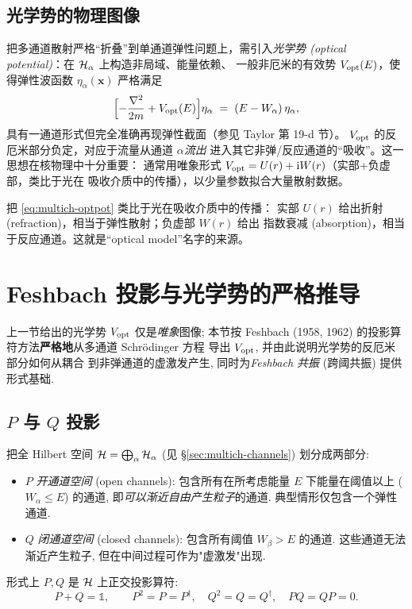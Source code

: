\subsection{光学势的物理图像}
\label{sec:multich-optpot}

把多通道散射严格“折叠”到单通道弹性问题上，需引入\emph{光学势
(optical potential)}：在 $\mathcal{H}_\alpha$ 上构造非局域、能量依赖、
一般非厄米的有效势 $V_{\rm opt}(E)$，使得弹性波函数
$\eta_\alpha(\mathbf{x})$ 严格满足
\begin{equation}
  \Bigl[-\frac{\nabla^2}{2m}+V_{\rm opt}(E)\Bigr]\eta_\alpha
  \;=\;(E-W_\alpha)\,\eta_\alpha ,
  \label{eq:multich-optpot}
\end{equation}
具有一通道形式但完全准确再现弹性截面（参见 Taylor 第 19-d 节）。
$V_{\rm opt}$ 的反厄米部分负定，对应于流量从通道 $\alpha$\emph{流出}
进入其它非弹/反应通道的“吸收”。这一思想在核物理中十分重要：
通常用唯象形式 $V_{\rm opt}=U(r)+\mathrm{i} W(r)$（实部+负虚部，类比于光在
吸收介质中的传播），以少量参数拟合大量散射数据。

\begin{remark}[复折射率类比]
  把 \eqref{eq:multich-optpot} 类比于光在吸收介质中的传播：
  实部 $U(r)$ 给出折射 (refraction)，相当于弹性散射；负虚部 $W(r)$ 给出
  指数衰减 (absorption)，相当于反应通道。这就是“optical model”名字的来源。
\end{remark}

\section{Feshbach 投影与光学势的严格推导}\label{sec:multich-Feshbach}

上一节给出的光学势 $V_{\rm opt}$ 仅是\emph{唯象}图像; 本节按 Feshbach (1958, 1962) 的投影算符方法\textbf{严格地}从多通道 Schrödinger 方程
导出 $V_{\rm opt}$, 并由此说明光学势的反厄米部分如何从耦合
到非弹通道的虚激发产生, 同时为\emph{Feshbach 共振} (跨阈共振) 提供
形式基础.

\subsection{$P$ 与 $Q$ 投影}\label{sec:multich-PQ}

把全 Hilbert 空间 $\mathcal{H}=\bigoplus_\alpha\mathcal{H}_\alpha$ (见 \S\ref{sec:multich-channels}) 划分成两部分:
\begin{itemize}
  \item $P$ \emph{开通道空间} (open channels): 包含所有在所考虑能量 $E$ 下能量在阈值以上 ($W_\alpha\le E$) 的通道, 即\emph{可以渐近自由产生粒子}的通道. 典型情形仅包含一个弹性通道.
  \item $Q$ \emph{闭通道空间} (closed channels): 包含所有阈值 $W_\beta>E$ 的通道. 这些通道无法渐近产生粒子, 但在中间过程可作为"虚激发"出现.
\end{itemize}
形式上 $P,Q$ 是 $\mathcal{H}$ 上正交投影算符:
\begin{equation}
  P+Q=\mathbb 1,\qquad P^2=P=P^\dagger,\quad Q^2=Q=Q^\dagger,\quad PQ=QP=0.
  \label{eq:multich-PQ}
\end{equation}

